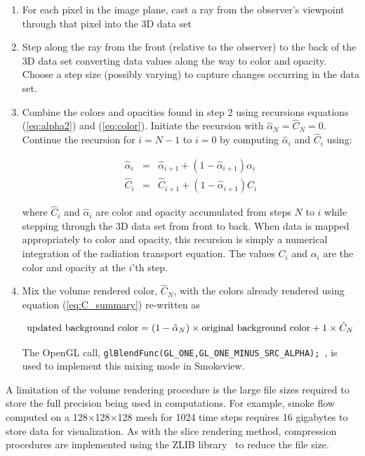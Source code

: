 {\begin{enumerate}

\item For each pixel in the image plane, cast a ray from the observer's viewpoint through that pixel into the 3D data set

\item Step along the ray from the front (relative to the observer) to the back of the 3D data set converting data values along the way to color and opacity.  Choose a step size (possibly varying) to capture changes occurring in the data set.

\item
Combine the colors and opacities found in step 2 using recursions equations (\ref{eq:alpha2}) and (\ref{eq:color}).
Initiate the recursion with $\hat{\alpha}_{N}=\hat{C}_{N}=0$. Continue the recursion for $i=N-1$ to $i=0$ by computing $\hat{\alpha}_i$ and $\hat{C}_i$ using:

\begin{eqnarray}
\hat{\alpha}_i&=&\hat{\alpha}_{i+1}+\left(1-\hat{\alpha}_{i+1}\right)\alpha_i\\
\hat{C}_i&=&\hat{C}_{i+1}+\left(1-\hat{\alpha}_{i+1}\right)C_i
\end{eqnarray}

where $\hat{C}_i$ and $\hat{\alpha}_i$ are color and opacity accumulated from steps $N$ to $i$ while stepping through the 3D data set from front to back.  When data is mapped appropriately to color and opacity, this recursion is simply a numerical integration of the radiation transport equation.
The values $C_i$ and $\alpha_i$ are the color and opacity at the $i$'th step.

\item Mix the volume rendered color, $\hat{C}_N$, with the colors already rendered using equation (\ref{eq:C_summary}) re-written as

\begin{eqnarray}
\noindent\mbox{updated background color} = (1-\hat{\alpha}_N)\times \mbox{original background color} + 1\times\hat{C}_N
\end{eqnarray}

The OpenGL call, {\tt   glBlendFunc(GL\_ONE,GL\_ONE\_MINUS\_SRC\_ALPHA); }, is used to implement this mixing mode in Smokeview.
\end{enumerate}

A limitation of the volume rendering procedure is the large file sizes required to store the full precision being used in computations.  For example, smoke flow computed on a 128$\times$128$\times$128 mesh for 1024 time steps requires 16 gigabytes to store data for visualization.  As with the slice rendering method, compression procedures are implemented using the ZLIB library~\cite{ZLIB} to reduce the file size.


}
